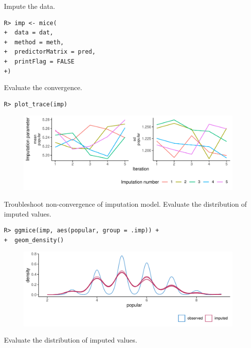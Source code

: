 \documentclass[
  article]{jss}
\begin{document}
Impute the data.

\begin{verbatim}
R> imp <- mice(
+  data = dat,
+  method = meth,
+  predictorMatrix = pred,
+  printFlag = FALSE
+)
\end{verbatim}

Evaluate the convergence.

\begin{verbatim}
R> plot_trace(imp)
\end{verbatim}

\begin{figure}[h]

{\centering \includegraphics{manuscript_files/figure-pdf/unnamed-chunk-19-1.pdf}

}

\end{figure}

Troubleshoot non-convergence of imputation model. Evaluate the
distribution of imputed values.

\begin{verbatim}
R> ggmice(imp, aes(popular, group = .imp)) + 
+  geom_density() 
\end{verbatim}

\begin{figure}[h]

{\centering \includegraphics{manuscript_files/figure-pdf/unnamed-chunk-20-1.pdf}

}

\end{figure}

Evaluate the distribution of imputed values.
\end{document}
